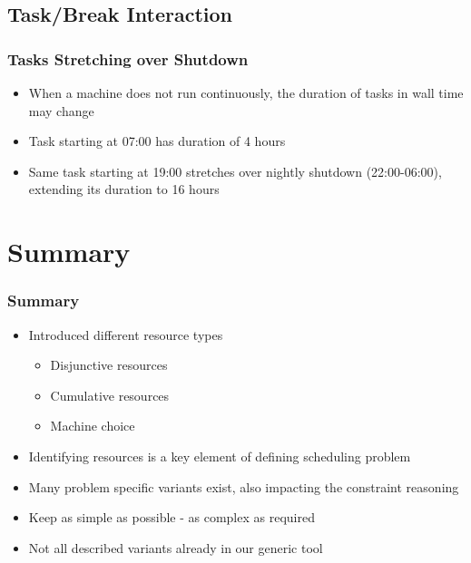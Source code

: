 \subsection{Task/Break Interaction}

\begin{frame}
\frametitle{Tasks Stretching over Shutdown \navail}
\begin{itemize}
\item When a machine does not run continuously, the duration of tasks in wall time may change
\end{itemize}

\scalebox{0.2}{

}

\begin{itemize}
\item Task starting at 07:00 has duration of 4 hours
\item Same task starting at 19:00 stretches over nightly shutdown (22:00-06:00), extending its duration to 16 hours
\end{itemize}

\end{frame}



\section{Summary}

\begin{frame}
\frametitle{Summary}
\begin{itemize}
\item Introduced different resource types
\begin{itemize}
\item Disjunctive resources
\item Cumulative resources
\item Machine choice
\end{itemize}
\item Identifying resources is a key element of defining scheduling problem
\item Many problem specific variants exist, also impacting the constraint reasoning
\item Keep as simple as possible - as complex as required
\item Not all described variants already in our generic tool
\end{itemize}
\end{frame}

